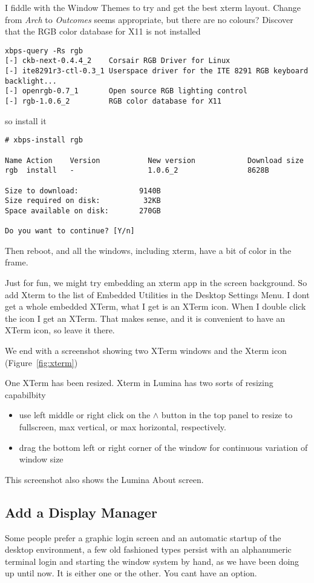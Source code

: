 \documentclass{article}  %
\begin{document}
I fiddle with the Window Themes to try and get the best xterm layout. Change from {\em Arch} to {\em Outcomes} seems appropriate, but there are no colours? Discover that the RGB color database for X11 is not installed
\begin{verbatim}
xbps-query -Rs rgb
[-] ckb-next-0.4.4_2    Corsair RGB Driver for Linux
[-] ite8291r3-ctl-0.3_1 Userspace driver for the ITE 8291 RGB keyboard backlight...
[-] openrgb-0.7_1       Open source RGB lighting control
[-] rgb-1.0.6_2         RGB color database for X11
\end{verbatim}
so install it
\begin{verbatim}
# xbps-install rgb

Name Action    Version           New version            Download size
rgb  install   -                 1.0.6_2                8628B 

Size to download:              9140B
Size required on disk:          32KB
Space available on disk:       270GB

Do you want to continue? [Y/n] 
\end{verbatim}
Then reboot, and all the windows, including xterm, have a bit of color in the frame.

Just for fun, we might try embedding an xterm app in the screen background. So add Xterm to the list of Embedded Utilities in the Desktop Settings Menu. I dont get a whole embedded XTerm, what I get is an XTerm icon. When I double click the icon I get an XTerm. That makes sense, and it is convenient to have an XTerm icon, so leave it there. 

We end with a screenshot showing  two XTerm windows and the Xterm icon (Figure~\ref{fig:xterm})

One XTerm has been resized. Xterm in Lumina has two sorts of  resizing capabilbity 
\begin{itemize}
\item  use left middle or right click on the $\wedge$ button in the top panel to resize to fullscreen, max vertical, or max horizontal, respectively.
\item drag the bottom left or right corner of the window for continuous variation of window size
\end{itemize}
 This screenshot also shows the Lumina About screen.


\clearpage

\subsection{Add a Display Manager}
Some people prefer a graphic login screen and an automatic startup of the desktop environment, a few old fashioned types persist with an alphanumeric terminal login and starting the window system by hand, as we have been doing up until now. It is either one or the other. You cant have an option.
\end{document}
